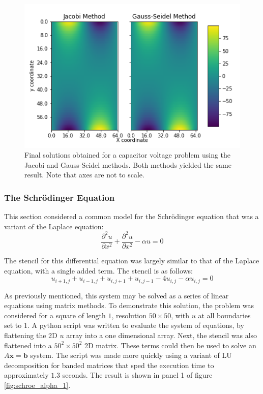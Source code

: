 \documentclass[twocolumn]{article}
\begin{document}
\begin{figure}
\centering
\includegraphics[width=\linewidth]{capacitor_methods}
\caption{Final solutions obtained for a capacitor voltage problem using the Jacobi and Gauss-Seidel methods. Both methods yielded the same result. Note that axes are not to scale.}
\label{fig:capacitor_methods}
\end{figure}

\subsubsection{The Schr\"{o}dinger Equation}
This section considered a common model for the Schr\"{o}dinger equation that was a variant of the Laplace equation:
\begin{equation}
\frac{\partial^2 u}{\partial x^2} + \frac{\partial^2 u}{\partial x^2} - \alpha u = 0
\end{equation}

The stencil for this differential equation was largely similar to that of the Laplace equation, with a single added term. The stencil is as follows:
\begin{equation}
	u_{i+1,j} + u_{i-1,j} + u_{i,j+1} + u_{i,j-1} - 4u_{i,j} -\alpha u_{i,j}=0
\end{equation}

As previously mentioned, this system may be solved as a series of linear equations using matrix methods. To demonstrate this solution, the problem was considered for a square of length $1$, resolution $50\times50$, with $u$ at all boundaries set to $1$. A python script was written to evaluate the system of equations, by flattening the 2D $u$ array into a one dimensional array. Next, the stencil was also flattened into a $50^2 \times 50^2$ 2D matrix. These terms could then be used to solve an $A\mathbf{x} = \mathbf{b}$ system. The script was made more quickly using a variant of LU decomposition for banded matrices that sped the execution time to approximately $1.3$ seconds. The result is shown in panel 1 of figure \ref{fig:schroe_alpha_1}.
\end{document}
